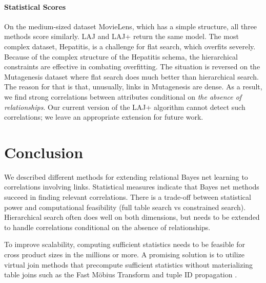 \documentclass{article}
\begin{document}
\paragraph{Statistical Scores}

 On the medium-sized dataset MovieLens, which has a simple structure, all three methods score similarly. LAJ and LAJ+ return the same model. 
The most complex dataset, Hepatitis, is a challenge for flat search, which overfits severely. Because of the complex structure of the Hepatitis schema, the hierarchical constraints are effective in combating overfitting.
The situation is reversed on the Mutagenesis dataset where flat search does much better than hierarchical search. The reason for that is that,  unusually, links in Mutagenesis are dense.
As a result, we find strong correlations between attributes conditional on {\em the absence of relationships}. Our current version of the LAJ+ algorithm cannot detect such correlations; we leave an appropriate extension for future work.
%



\section{Conclusion} We described different methods for extending relational Bayes net learning to correlations involving links. 
Statistical measures indicate that Bayes net methods succeed in finding relevant correlations. 
There is a trade-off between statistical power and computational feasibility (full table search vs constrained search). 
Hierarchical search often does well on both dimensions, but needs to be extended to handle correlations conditional on the absence of relationships. 

To improve scalability, computing sufficient statistics needs to be feasible for cross product sizes in the millions or more. A promising solution is to utilize virtual join methods that precompute sufficient statistics without materializing table joins such as the Fast M\"obius Transform \cite{Schulte2012} and tuple ID propagation \cite{Yin2004}.



\end{document}
